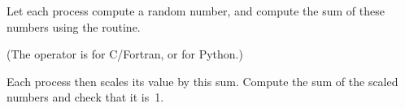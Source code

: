   \label{ex:randommaxscale}
  Let each process compute a random number,
  and compute the sum of these numbers using the 
  routine.

  (The operator is  for C/Fortran, or  for
  Python.)

  Each process then scales its value
  by this sum. Compute the sum of the scaled numbers and check that it is~1.
